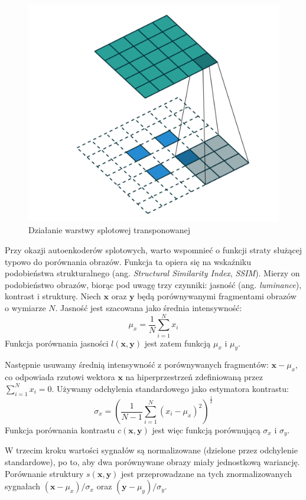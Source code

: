 \documentclass[12pt]{mwbk}
\theoremstyle{plain}
\theoremstyle{definition}
\theoremstyle{remark}
\newcommand\zrodlo[1]{\par\vspace{-3mm}{\small\textit{Źródło: }#1 }}
\begin{document}
\begin{figure}[!h]
	\centering
	\includegraphics[width=0.7\linewidth]{rys/conv2dtranspose.png}
	\caption{Działanie warstwy splotowej transponowanej}
	\zrodlo{\cite{prove}}
	\label{fig:conv2dtranspose}
\end{figure}

\newpage

Przy okazji autoenkoderów splotowych, warto wspomnieć o funkcji straty służącej typowo do porównania obrazów. Funkcja ta opiera się na wskaźniku podobieństwa strukturalnego (ang. \emph{Structural Similarity Index}, \emph{SSIM}). Mierzy on podobieństwo obrazów, biorąc pod uwagę trzy czynniki: jasność (ang. \emph{luminance}), kontrast i strukturę. Niech $\mathbf{x}$ oraz $\mathbf{y}$ będą porównywanymi fragmentami obrazów o wymiarze $N$. Jasność jest szacowana jako średnia intensywność:
$$\mu_x=\frac{1}{N}\sum_{i=1}^N x_i$$
Funkcja porównania jasności $l(\mathbf{x}, \mathbf{y})$ jest zatem funkcją $\mu_x$ i $\mu_y$.

Następnie usuwamy średnią intensywność z porównywanych fragmentów: $\mathbf{x}-\mu_x$, co odpowiada rzutowi wektora $\mathbf{x}$ na hiperprzestrzeń zdefiniowaną przez $\displaystyle \sum_{i=1}^N x_i=0$. Używamy odchylenia standardowego jako estymatora kontrastu:
$$\sigma_x=\left(\frac{1}{N-1}\sum_{i=1}^N (x_i-\mu_x)^2\right)^{\frac{1}{2}}$$
Funkcja porównania kontrastu $c(\mathbf{x}, \mathbf{y})$ jest więc funkcją porównującą $\sigma_x$ i $\sigma_y$.

W trzecim kroku wartości sygnałów są normalizowane (dzielone przez odchylenie standardowe), po to, aby dwa porównywane obrazy miały jednostkową wariancję. Porównanie struktury $s(\mathbf{x}, \mathbf{y})$ jest przeprowadzane na tych znormalizowanych sygnałach $(\mathbf{x}-\mu_x)/\sigma_x$ oraz  $(\mathbf{y}-\mu_y)/\sigma_y$.
\end{document}
